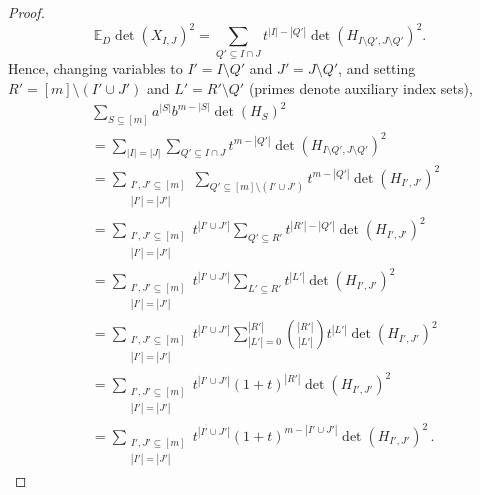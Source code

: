 \documentclass[prx,twocolumn,superscriptaddress,aps,10pt, frontmatterverbose, reprint,footinbib,longbibliography=true]{revtex4-2}
\begin{document}
\begin{proof}
\begin{equation}
    \mathbb{E}_D\det(X_{I,J})^2=\sum_{Q'\subseteq I\cap J}t^{|I|-|Q'|}\det(H_{I\setminus Q',J\setminus Q'})^2 .
\end{equation} 
Hence, changing variables to $I'=I\setminus Q'$ and $J'=J\setminus Q'$, and setting $R'=[m]\setminus (I' \cup J')$ and $L'=R' \setminus Q'$ (primes denote auxiliary index sets),
\begin{equation}
    \begin{split}
        &\sum_{S\subseteq[m]}a^{|S|}b^{m-|S|}\det(H_S)^2\\
        &=\sum_{|I|=|J|} \sum_{Q'\subseteq I\cap J}t^{m-|Q'|}   \det(H_{I\setminus Q',J\setminus Q'})^2\\
        &= \sum_{\substack{I',J'\subseteq[m]\\ |I'|=|J'|}} \sum_{Q'\subseteq[m]\setminus(I'\cup J')}
t^{m-|Q'|}
\det(H_{I',J'})^2
\\
&=\sum_{\substack{I',J'\subseteq[m]\\ |I'|=|J'|}} t^{|I'\cup J'|}\sum_{Q'\subseteq R'}
t^{|R'|-|Q'|}
\det(H_{I',J'})^2
\\
&=\sum_{\substack{I',J'\subseteq[m]\\ |I'|=|J'|}} t^{|I'\cup J'|}\sum_{L' \subseteq R'}
t^{|L'|}
\det(H_{I',J'})^2
\\
&=\sum_{\substack{I',J'\subseteq[m]\\ |I'|=|J'|}} t^{|I'\cup J'|}\sum_{|L'|=0}^{|R'|} \binom{|R'|}{|L'|}
t^{|L'|}
\det(H_{I',J'})^2
\\
&=\sum_{\substack{I',J'\subseteq[m]\\ |I'|=|J'|}} t^{|I'\cup J'|}(1+t)^{|R'|}
\det(H_{I',J'})^2\\
&=\sum_{\substack{I',J'\subseteq[m]\\ |I'|=|J'|}} t^{|I'\cup J'|}(1+t)^{m-|I' \cup J'|}
\det(H_{I',J'})^2 \,.
    \end{split}
\end{equation} 


\end{proof}
\end{document}

